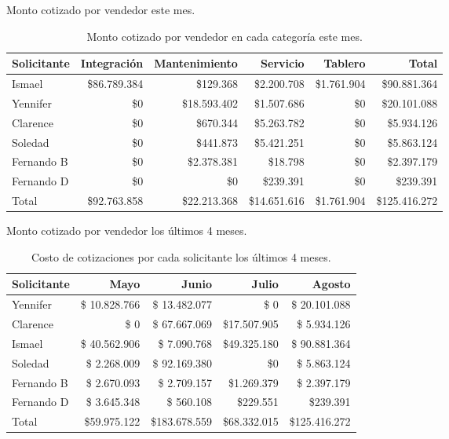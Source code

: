 \documentclass[aspectratio=169,xcolor=dvipsnames]{beamer}
\begin{document}
\begin{frame}{Monto cotizado por vendedor este mes.}

\begin{table}[h!]
\begin{tabular}{|l|r|r|r|r|r|}\hline
  \rowcolor{MediumBlue} \color{white}Solicitante & \color{white} Integración & \color{white} Mantenimiento& \color{white} Servicio & \color{white} Tablero & \color{white}  Total\\\hline
Ismael & \$86.789.384 & \$129.368 & \$2.200.708 & \$1.761.904 & \$90.881.364 \\
Yennifer & \$0 & \$18.593.402 & \$1.507.686 & \$0 & \$20.101.088 \\
Clarence & \$0 & \$670.344 & \$5.263.782 & \$0 & \$5.934.126 \\
Soledad & \$0 & \$441.873 & \$5.421.251 & \$0 & \$5.863.124 \\
Fernando B & \$0 & \$2.378.381 & \$18.798 & \$0 & \$2.397.179 \\
Fernando D & \$0 & \$0 & \$239.391 & \$0 & \$239.391 \\ \hline
Total & \$92.763.858 & \$22.213.368 & \$14.651.616 & \$1.761.904 & \$125.416.272
 \\ \hline
\end{tabular}
\caption{Monto cotizado por vendedor en cada categoría este mes.}
\label{table:monto_cotizado_vendedor}
\end{table}
\end{frame}


\begin{frame}{Monto cotizado por vendedor los últimos 4 meses.}

\begin{table}[h!]
\begin{tabular}{|l|r|r|r|r|}\hline
  \rowcolor{MediumBlue} \color{white}Solicitante &\color{white} Mayo &\color{white} Junio &\color{white} Julio &\color{white} Agosto\\ \hline
Yennifer &\$ 10.828.766 &\$ 13.482.077&\$ 0 &\$ 20.101.088\\
Clarence &\$ 0 &\$ 67.667.069 &\$17.507.905 &\$ 5.934.126\\
Ismael  &\$ 40.562.906 &\$ 7.090.768&\$49.325.180&\$ 90.881.364\\
Soledad  &\$ 2.268.009 &\$ 92.169.380 &\$0 &\$ 5.863.124\\
Fernando B  &\$ 2.670.093 &\$ 2.709.157&\$1.269.379&\$ 2.397.179 \\
Fernando D  &\$ 3.645.348 &\$ 560.108 &\$229.551 &\$239.391\\ \hline
Total&\$59.975.122&\$183.678.559& \$68.332.015&\$125.416.272 \\\hline
\end{tabular}
\caption{Costo de cotizaciones por cada solicitante los últimos 4 meses.}
\label{table:cotizaciones_ultimos_4_meses}
\end{table}
\end{frame}
\end{document}
